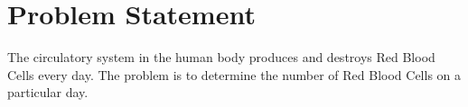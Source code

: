 \section{Problem Statement}

The circulatory system in the human body produces and destroys Red Blood Cells every day. The problem is to determine the number of Red Blood Cells on a particular day. \cite{book1}
